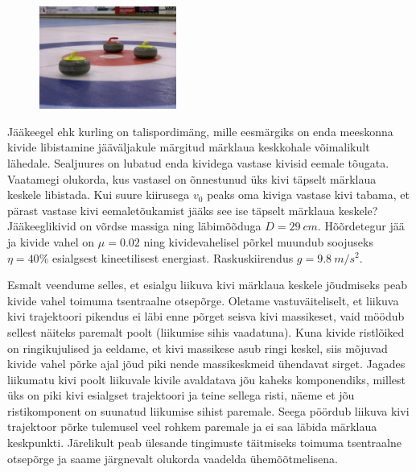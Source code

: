 \setAuthor{}

\begin{figure}
  \vspace{-25pt}
  \begin{center}
    \includegraphics[width=0.4\textwidth]{2019-v3g-05-yl.jpg}
  \end{center}
  \vspace{-20pt}
\end{figure}

Jääkeegel ehk kurling on talispordimäng, mille eesmärgiks on enda meeskonna kivide libistamine jääväljakule märgitud märklaua keskkohale võimalikult lähedale. Sealjuures on lubatud enda kividega vastase kivisid eemale tõugata. Vaatamegi olukorda, kus vastasel on õnnestunud üks kivi täpselt märklaua keskele libistada. Kui suure kiirusega $v_0$ peaks oma kiviga vastase kivi tabama, et pärast vastase kivi eemaletõukamist jääks see ise täpselt märklaua keskele? Jääkeeglikivid on võrdse massiga ning läbimõõduga $D=\SI{29}{cm}$. Hõõrdetegur jää ja kivide vahel on $\mu = \num{0.02}$ ning kividevahelisel põrkel muundub soojuseks $\eta=40\%$ esialgsest kineetilisest energiast. Raskuskiirendus $g=\SI{9.8}{m/s^2}$.


\hint

\solu
Esmalt veendume selles, et esialgu liikuva kivi märklaua keskele jõudmiseks peab kivide vahel toimuma tsentraalne otsepõrge. Oletame vastuväiteliselt, et liikuva kivi trajektoori pikendus ei läbi enne põrget seisva kivi massikeset, vaid möödub sellest näiteks paremalt poolt (liikumise sihis vaadatuna). Kuna kivide ristlõiked on ringikujulised ja eeldame, et kivi massikese asub ringi keskel, siis mõjuvad kivide vahel põrke ajal jõud piki nende massikeskmeid ühendavat sirget. Jagades liikumatu kivi poolt liikuvale kivile avaldatava jõu kaheks komponendiks, millest üks on piki kivi esialgset trajektoori ja teine sellega risti, näeme et jõu ristikomponent on suunatud liikumise sihist paremale. Seega pöördub liikuva kivi trajektoor põrke tulemusel veel rohkem paremale ja ei saa läbida märklaua keskpunkti. Järelikult peab ülesande tingimuste täitmiseks toimuma tsentraalne otsepõrge ja saame järgnevalt olukorda vaadelda ühemõõtmelisena.


